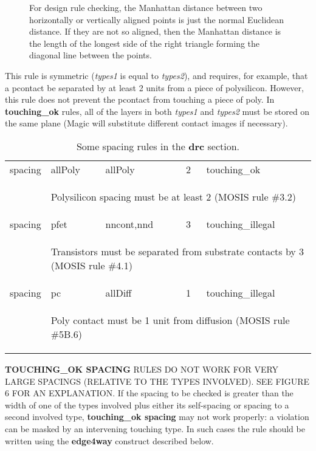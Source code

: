 \documentclass[letterpaper,twoside,12pt]{article}
\def\q{\special{ps:(") show}\hspace*{0.6em}}
\def\bk{\special{ps:/bksp 2 string def bksp 0 92 put bksp show}\hspace*{0.4em}}
\begin{document}
\begin{figure}[ht]
   \begin{center}
      \caption{For design rule checking, the Manhattan distance between
	two horizontally or vertically aligned points is just the normal
	Euclidean distance.  If they are not so aligned, then the Manhattan
	distance is the length of the longest side of the right triangle
	forming the diagonal line between the points.}
   \end{center}
   \label{distance}
\end{figure}

This rule is symmetric ({\itshape types1} is equal to {\itshape types2}),
and requires, for example, that a pcontact
be separated by at least 2 units from a piece of polysilicon.
However, this rule does not prevent the pcontact
from touching a piece of poly.  In {\bfseries touching{\_}ok} rules,
all of the layers in both {\itshape types1} and {\itshape types2} must be stored
on the same plane (Magic will substitute different contact
images if necessary).  

\begin{table}[ht]
   \begin{center}
      \begin{tabular}{|lllll|} \hline
	spacing	 & allPoly & allPoly & 2 & touching{\_}ok {\bk} \\
		 & \multicolumn{4}{l|}{{\itshape {\q}Polysilicon spacing must be
		   at least 2 (MOSIS rule \#3.2){\q}}} \\
	spacing	 & pfet	 & nncont,nnd &	3 & touching{\_}illegal {\bk} \\
		 & \multicolumn{4}{l|}{{\itshape {\q}Transistors must be separated
		   from substrate contacts by 3 (MOSIS rule \#4.1){\q}}} \\
	spacing	 & pc	 & allDiff    &	1 & touching{\_}illegal {\bk} \\
		 & \multicolumn{4}{l|}{{\itshape {\q}Poly contact must be 1 unit
		   from diffusion (MOSIS rule \#5B.6){\q}}} \\ \hline
      \end{tabular}
      \caption{Some spacing rules in the {\bfseries drc} section.}
      \label{drcspacing}
   \end{center}
\end{table}

{\bfseries TOUCHING{\_}OK SPACING} RULES DO NOT WORK
FOR VERY LARGE SPACINGS (RELATIVE TO THE TYPES INVOLVED).  SEE FIGURE 6
FOR AN EXPLANATION.  If the spacing to be checked is greater
than the width of one of the types involved plus either its self-spacing or 
spacing to a second involved type,
{\bfseries touching{\_}ok spacing} may not work properly:  a violation can
be masked by an intervening touching type.  In such cases the rule
should be written using the {\bfseries edge4way} construct described below. 
\end{document}
